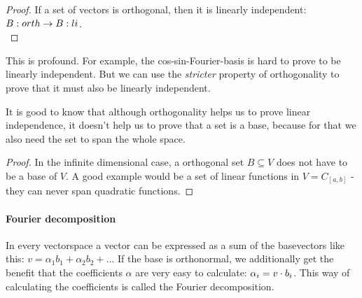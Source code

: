 \begin{proof} If a set of vectors is orthogonal, then it is linearly independent: $B:orth \to B:li$. \\
\end{proof}
This is profound. For example, the cos-sin-Fourier-basis is hard to prove to be linearly independent. But we can use the \emph{stricter} property of orthogonality to prove that it must also be linearly independent. 

It is good to know that although orthogonality helps us to prove linear independence, it doesn't help us to prove that a set is a base, because for that we also need the set to span the whole space. 
\begin{proof} In the infinite dimensional case, a orthogonal set $B \subseteq V$ does not have to be a base of $V$. A good example would be a set of linear functions in $V = C_{[a,b]}$ - they can never span quadratic functions. 
\end{proof}

\paragraph{Fourier decomposition} \label{fourierDecomposition}
In every vectorspace a vector can be expressed as a sum of the basevectors like this: $v = \alpha_1 b_1 + \alpha_2 b_2 + ...$ If the base is orthonormal, we additionally get the benefit that the coefficients $\alpha$ are very easy to calculate: $\alpha_i = v \cdot b_i$. This way of calculating the coefficients is called the Fourier decomposition. 

